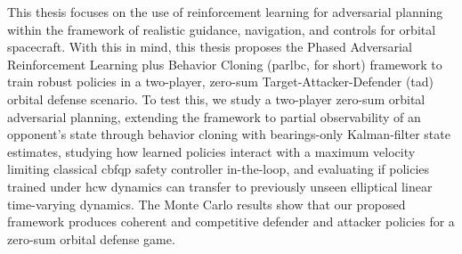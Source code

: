 This thesis focuses on the use of reinforcement learning for adversarial planning within the framework of realistic guidance, navigation, and controls for orbital spacecraft. With this in mind, this thesis proposes the Phased Adversarial Reinforcement Learning plus Behavior Cloning (\acs{parlbc}, for short) framework to train robust policies in a two-player, zero-sum Target-Attacker-Defender (\acs{tad}) orbital defense scenario. To test this, we study a two-player zero-sum orbital adversarial planning, extending the framework to partial observability of an opponent's state through behavior cloning with bearings-only Kalman-filter state estimates, studying how learned policies interact with a maximum velocity limiting classical \acs{cbfqp} safety controller in-the-loop, and evaluating if policies trained under \acs{hcw} dynamics can transfer to previously unseen elliptical linear time-varying dynamics. The Monte Carlo results show that our proposed framework produces coherent and competitive defender and attacker policies for a zero-sum orbital defense game.
